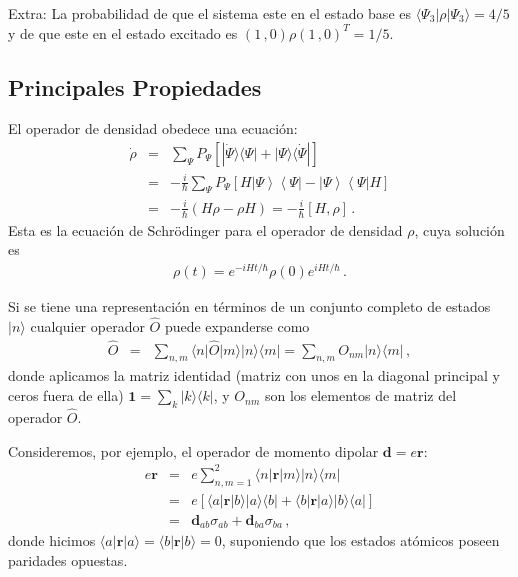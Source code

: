 \documentclass[twocolumn,aps,eqsecnum]{revtex4}
\newcommand{\mbd}{\mathbf{d}}
\newcommand{\mbr}{\mathbf{r}}
\providecommand{\bra}[1]{\langle #1 \rvert}
\providecommand{\ket}[1]{\lvert #1 \rangle}
\newcommand{\ketbra}[2]{\left| {#1} \right\rangle\left\langle {#2}\right|}
\begin{document}
Extra: La probabilidad de que el sistema este en el estado base es 
$\bra{\Psi_3} \rho \ket{\Psi_3} =4/5$ y de que este en el estado 
excitado es $(1\,, 0) \rho (1\,,0)^T =1/5$.

\subsection{Principales Propiedades}
El operador de densidad obedece una ecuaci\'on: 
%
\begin{eqnarray}
\dot{\rho} &=& \sum_{\Psi} P_{\Psi} \left[ | \dot{\Psi} \rangle \bra{\Psi}  
	+ \ket{\Psi} \langle \dot{\Psi} | \right] 	\nonumber \\ 
&=& - \frac{i}{\hbar} \sum_{\Psi} P_{\Psi} \left[ 
	H \ketbra{\Psi}{\Psi} - \ketbra{\Psi}{\Psi} H \right] 
	\nonumber \\ 
&=& - \frac{i}{\hbar} (H \rho -\rho H) 	= - \frac{i}{\hbar} [H, \rho] 	\,.
\end{eqnarray}
Esta es la ecuaci\'on de Schr\"odinger para el operador de densidad $\rho$, 
cuya soluci\'on es  
%
\begin{eqnarray}
\rho (t) = e^{-iHt/\hbar} \rho(0)  e^{iHt/\hbar} \,.
\end{eqnarray}

Si se tiene una representaci\'on en t\'erminos de un conjunto completo de 
estados $\ket{n}$ cualquier operador $\hat{O}$ puede expanderse como 
%
\begin{eqnarray}
\hat{O} &=& \sum_{n,m} \bra{n} \hat{O} \ket{m} \ket{n} \bra{m}  
	= \sum_{n,m} O_{nm} \ket{n} \bra{m} \,,
\end{eqnarray}
donde aplicamos la matriz identidad (matriz con unos en la diagonal 
principal y ceros fuera de ella) $\mathbf{1} =\sum_k \ket{k} \bra{k}$, y 
$O_{nm}$ son los elementos de matriz del operador $\hat{O}$. 

Consideremos, por ejemplo, el operador de momento dipolar 
$\mbd= e \mbr$: 
%
\begin{eqnarray}
e\mbr &=& e \sum_{n,m=1}^2 \bra{n} \mbr \ket{m} \ket{n} \bra{m}  
	\nonumber \\
	&=& e \left[ \bra{a} \mbr \ket{b} \ket{a} \bra{b} 
		+\bra{b} \mbr \ket{a} \ket{b} \bra{a}  \right] 		\nonumber \\
	&=& \mbd_{ab} \sigma_{ab} +\mbd_{ba} \sigma_{ba} \,,
\end{eqnarray}
donde hicimos $\bra{a} \mbr \ket{a} = \bra{b} \mbr \ket{b} =0$, suponiendo 
que los estados at\'omicos poseen paridades opuestas. 
\end{document}
